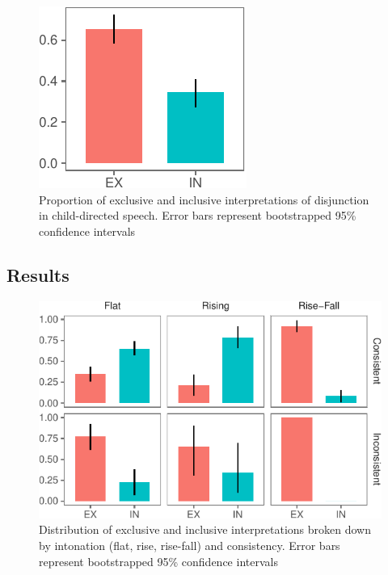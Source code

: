 \documentclass[10pt, letterpaper]{article}
\newenvironment{CodeChunk}{}{}
\begin{document}
\begin{CodeChunk}
\begin{figure}[b]

{\centering \includegraphics{figs/interpretation-1} 

}

\caption[Proportion of exclusive and inclusive interpretations of disjunction in child-directed speech]{Proportion of exclusive and inclusive interpretations of disjunction in child-directed speech. Error bars represent bootstrapped 95\% confidence intervals}\label{fig:interpretation}
\end{figure}
\end{CodeChunk}

\subsection{Results}\label{results-1}

\begin{CodeChunk}
\begin{figure}[t]

{\centering \includegraphics{figs/interpretationByIntonationAndConsistency-1} 

}

\caption[Distribution of exclusive and inclusive interpretations broken down by intonation (flat, rise, rise-fall) and consistency]{Distribution of exclusive and inclusive interpretations broken down by intonation (flat, rise, rise-fall) and consistency. Error bars represent bootstrapped 95\% confidence intervals}\label{fig:interpretationByIntonationAndConsistency}
\end{figure}
\end{CodeChunk}
\end{document}
